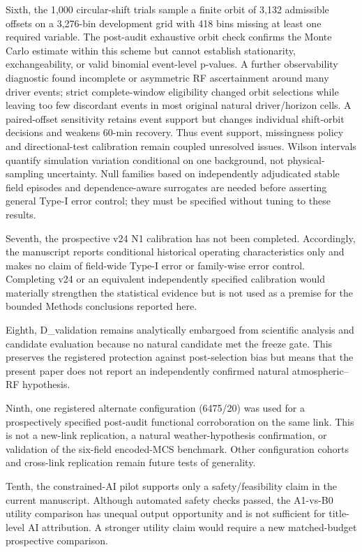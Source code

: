 \documentclass{ieeeaccess}
\begin{document}
Sixth, the 1,000 circular-shift trials sample a finite orbit of 3,132 admissible offsets on a 3,276-bin development grid with 418 bins missing at least one required variable. The post-audit exhaustive orbit check confirms the Monte Carlo estimate within this scheme but cannot establish stationarity, exchangeability, or valid binomial event-level p-values. A further observability diagnostic found incomplete or asymmetric RF ascertainment around many driver events; strict complete-window eligibility changed orbit selections while leaving too few discordant events in most original natural driver/horizon cells. A paired-offset sensitivity retains event support but changes individual shift-orbit decisions and weakens 60-min recovery. Thus event support, missingness policy and directional-test calibration remain coupled unresolved issues. Wilson intervals quantify simulation variation conditional on one background, not physical-sampling uncertainty. Null families based on independently adjudicated stable field episodes and dependence-aware surrogates are needed before asserting general Type-I error control; they must be specified without tuning to these results.

Seventh, the prospective v24 N1 calibration has not been completed. Accordingly, the manuscript reports conditional historical operating characteristics only and makes no claim of field-wide Type-I error or family-wise error control. Completing v24 or an equivalent independently specified calibration would materially strengthen the statistical evidence but is not used as a premise for the bounded Methods conclusions reported here.

Eighth, D\_validation remains analytically embargoed from scientific analysis and candidate evaluation because no natural candidate met the freeze gate. This preserves the registered protection against post-selection bias but means that the present paper does not report an independently confirmed natural atmospheric--RF hypothesis.

Ninth, one registered alternate configuration (6475/20) was used for a prospectively specified post-audit functional corroboration on the same link. This is not a new-link replication, a natural weather-hypothesis confirmation, or validation of the six-field encoded-MCS benchmark. Other configuration cohorts and cross-link replication remain future tests of generality.

Tenth, the constrained-AI pilot supports only a safety/\allowbreak feasibility claim in the current manuscript. Although automated safety checks passed, the A1-vs-B0 utility comparison has unequal output opportunity and is not sufficient for title-level AI attribution. A stronger utility claim would require a new matched-budget prospective comparison.
\end{document}
